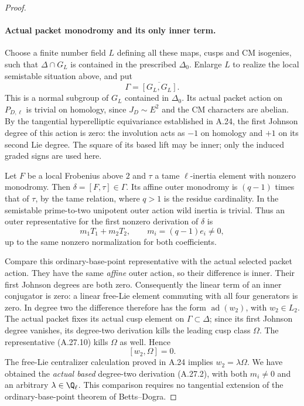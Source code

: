 \begin{proof}
\paragraph{Actual packet monodromy and its only inner term.}
Choose a finite number field $L$ defining all these maps,
cusps and CM isogenies, such that $\Delta\cap G_L$ is
contained in the prescribed $\Delta_0$. Enlarge $L$ to
realize the local semistable situation above, and put
\[
                      \Gamma=\overline{[G_L,G_L]}.
\]
This is a normal subgroup of $G_L$ contained in
$\Delta_0$. Its actual packet action on $P_{D,\ell}$ is
trivial on homology, since $J_D\sim E^2$ and the CM
characters are abelian. By the tangential hyperelliptic
equivariance established in A.24, the first Johnson
degree of this action is zero: the involution acts as
$-1$ on homology and $+1$ on its second Lie degree.
The square of its based lift may be inner; only the
induced graded signs are used here.

Let $F$ be a local Frobenius above $2$ and $\tau$ a tame
$\ell$-inertia element with nonzero monodromy. Then
$\delta=[F,\tau]\in\Gamma$. Its affine outer monodromy
is $(q-1)$ times that of $\tau$, by the tame relation,
where $q>1$ is the residue cardinality. In the semistable
prime-to-two unipotent outer action wild inertia is
trivial. Thus an outer representative for the first
nonzero derivation of $\delta$ is
\[
             m_1T_1+m_2T_2,
                \qquad m_i=(q-1)e_i\ne0,
                                                        \tag{A.27.10}
\]
up to the same nonzero normalization for both coefficients.

Compare this ordinary-base-point representative with
the actual selected packet action. They have the same
\emph{affine} outer action, so their difference is inner.
Their first Johnson degrees are both zero. Consequently
the linear term of an inner conjugator is zero: a linear
free-Lie element commuting with all four generators is
zero. In degree two the difference therefore has the form
$\operatorname{ad}(w_2)$, with $w_2\in L_2$.
The actual packet fixes its actual cusp element on
$\Gamma\subset\Delta$; since its first Johnson degree
vanishes, its degree-two derivation kills the leading
cusp class $\Omega$. The representative (A.27.10) kills
$\Omega$ as well. Hence
\[
                              [w_2,\Omega]=0.
\]
The free-Lie centralizer calculation proved in A.24
implies $w_2=\lambda\Omega$. We have obtained the
\emph{actual based} degree-two derivation (A.27.2), with
both $m_i\ne0$ and an arbitrary $\lambda\in\Q_\ell$.
This comparison requires no tangential extension of the
ordinary-base-point theorem of Betts--Dogra.


\end{proof}

